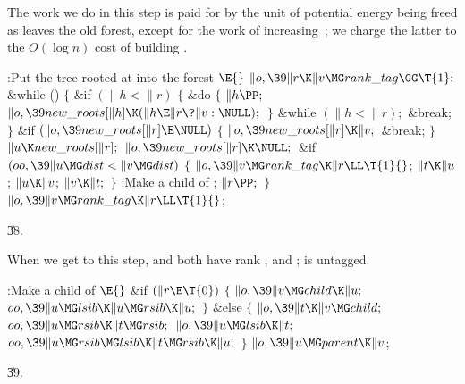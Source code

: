 The work we do in this step is paid for by the unit of potential
energy being freed as  leaves the old forest, except for the
work of increasing~; we charge the latter to the $O(\log n)$ cost of
building .

\Y\B\4:Put the tree rooted at  into the  forest%
\X${}\E{}$\6
$\|o,\39\|r\K\|v\MG\\{rank\_tag}\GG\T{1};{}$\6
\&{while} ()\5
${}\{{}$\1\6
\&{if} ${}(\|h<\|r){}$\5
${}\{{}$\1\6
\&{do}\5
${}\{{}$\1\6
${}\|h\PP;{}$\6
${}\|o,\39\\{new\_roots}[\|h]\K(\|h\E\|r\?\|v:\NULL);{}$\6
\4${}\}{}$\5
\2\5
\&{while} ${}(\|h<\|r);{}$\6
\&{break};\6
\4${}\}{}$\2\6
\&{if} ${}(\|o,\39\\{new\_roots}[\|r]\E\NULL){}$\5
${}\{{}$\1\6
${}\|o,\39\\{new\_roots}[\|r]\K\|v;{}$\6
\&{break};\6
\4${}\}{}$\2\6
${}\|u\K\\{new\_roots}[\|r];{}$\6
${}\|o,\39\\{new\_roots}[\|r]\K\NULL;{}$\6
\&{if} ${}(\\{oo},\39\|u\MG\\{dist}<\|v\MG\\{dist}){}$\5
${}\{{}$\1\6
${}\|o,\39\|v\MG\\{rank\_tag}\K\|r\LL\T{1}{}$;\6
${}\|t\K\|u{}$;\5
${}\|u\K\|v{}$;\5
${}\|v\K\|t;{}$\6
\4${}\}{}$\2\6
:Make  a child of \X;\6
${}\|r\PP;{}$\6
\4${}\}{}$\2\6
${}\|o,\39\|v\MG\\{rank\_tag}\K\|r\LL\T{1}{}$;\par
\U38.\fi

When we get to this step,  and  both have rank ,
and
;  is untagged.

\Y\B\4:Make  a child of \X${}\E{}$\6
\&{if} ${}(\|r\E\T{0}){}$\5
${}\{{}$\1\6
${}\|o,\39\|v\MG\\{child}\K\|u;{}$\6
${}\\{oo},\39\|u\MG\\{lsib}\K\|u\MG\\{rsib}\K\|u;{}$\6
\4${}\}{}$\5
\2\&{else}\5
${}\{{}$\1\6
${}\|o,\39\|t\K\|v\MG\\{child};{}$\6
${}\\{oo},\39\|u\MG\\{rsib}\K\|t\MG\\{rsib};{}$\6
${}\|o,\39\|u\MG\\{lsib}\K\|t;{}$\6
${}\\{oo},\39\|u\MG\\{rsib}\MG\\{lsib}\K\|t\MG\\{rsib}\K\|u;{}$\6
\4${}\}{}$\2\6
${}\|o,\39\|u\MG\\{parent}\K\|v{}$;\par
\U39.\fi

